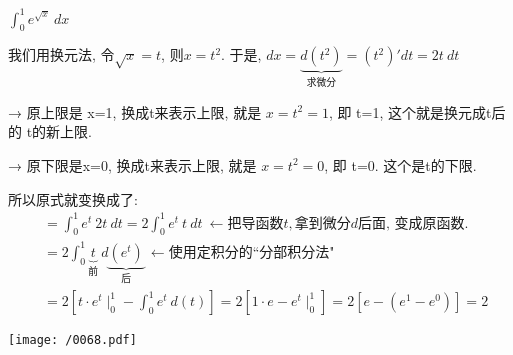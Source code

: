 \documentclass[UTF8]{ctexart}
\begin{document}
\begin{myEnvSample}
	$\int_0^1{e^{\sqrt{x}}}\ dx$ 
	
	我们用换元法, 令$\sqrt{x}=t$, 则$x=t^2$. 于是, $dx=\underset{\text{求微分}}{\underbrace{d\left( t^2 \right) }}=\left( t^2 \right) 'dt=2t\ dt$
	
	→ 原上限是 x=1, 换成t来表示上限, 就是 $x=t^2=1$, 即 t=1, 这个就是换元成t后的 t的新上限.
	
	→ 原下限是x=0, 换成t来表示上限, 就是 $x=t^2=0$, 即 t=0. 这个是t的下限.
	
	所以原式就变换成了: 
	\begin{align*}
		&=\int_0^1{e^t}\ 2t\ dt=2\int_0^1{e^t}\ t\ dt\ \gets \text{把导函数}t,\text{拿到微分}d\text{后面,\ 变成原函数}.\\
	&=2\int_0^1{\underset{\text{前}}{\underbrace{t}}}\ d\underset{\text{后}}{\underbrace{\left( e^t \right) }}\ \gets \text{使用定积分的``分部积分法"}\\
	&=2\left[ t\cdot e^t\mid_{0}^{1}-\int_0^1{e^t\ d\left( t \right)} \right] =2\left[ 1\cdot e-e^t\mid_{0}^{1} \right] =2\left[ e-\left( e^1-e^0 \right) \right] =2
	\end{align*}

	\texttt{[image: /0068.pdf]}
\end{myEnvSample}
	
	
	
	
	
\end{document}
